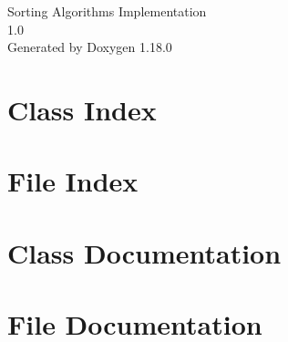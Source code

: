 \documentclass[twoside]{book}
\newcommand{\+}{\discretionary{\mbox{\scriptsize$\hookleftarrow$}}{}{}}
\newcommand{\clearemptydoublepage}{%
    \newpage{\pagestyle{empty}\cleardoublepage}%
  }
\begin{document}
  \raggedbottom
    \hypersetup{pageanchor=false,
                bookmarksnumbered=true,
                pdfencoding=unicode
               }
  \begin{titlepage}
  \vspace*{7cm}
  \begin{center}%
  {\Large Sorting Algorithms Implementation}\\
  [1ex]\large 1.\+0 \\
  \vspace*{1cm}
  {\large Generated by Doxygen 1.18.0}\\
  \end{center}
  \end{titlepage}
  \clearemptydoublepage
  \tableofcontents
  \clearemptydoublepage
  \hypersetup{pageanchor=true}
\chapter{Class Index}

\chapter{File Index}

\chapter{Class Documentation}

\chapter{File Documentation}







  \backmatter
  \newpage
  \clearemptydoublepage
  \printindex
\end{document}
